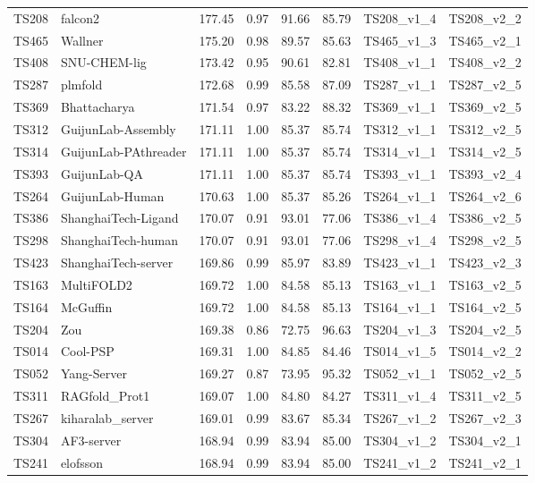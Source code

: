 \begin{longtable}{llllllll}
TS208 & falcon2 & 177.45 & 0.97 & 91.66 & 85.79 & TS208\_v1\_4 & TS208\_v2\_2 \\ 
TS465 & Wallner & 175.20 & 0.98 & 89.57 & 85.63 & TS465\_v1\_3 & TS465\_v2\_1 \\ 
TS408 & SNU-CHEM-lig & 173.42 & 0.95 & 90.61 & 82.81 & TS408\_v1\_1 & TS408\_v2\_2 \\ 
TS287 & plmfold & 172.68 & 0.99 & 85.58 & 87.09 & TS287\_v1\_1 & TS287\_v2\_5 \\ 
TS369 & Bhattacharya & 171.54 & 0.97 & 83.22 & 88.32 & TS369\_v1\_1 & TS369\_v2\_5 \\ 
TS312 & GuijunLab-Assembly & 171.11 & 1.00 & 85.37 & 85.74 & TS312\_v1\_1 & TS312\_v2\_5 \\ 
TS314 & GuijunLab-PAthreader & 171.11 & 1.00 & 85.37 & 85.74 & TS314\_v1\_1 & TS314\_v2\_5 \\ 
TS393 & GuijunLab-QA & 171.11 & 1.00 & 85.37 & 85.74 & TS393\_v1\_1 & TS393\_v2\_4 \\ 
TS264 & GuijunLab-Human & 170.63 & 1.00 & 85.37 & 85.26 & TS264\_v1\_1 & TS264\_v2\_6 \\ 
TS386 & ShanghaiTech-Ligand & 170.07 & 0.91 & 93.01 & 77.06 & TS386\_v1\_4 & TS386\_v2\_5 \\ 
TS298 & ShanghaiTech-human & 170.07 & 0.91 & 93.01 & 77.06 & TS298\_v1\_4 & TS298\_v2\_5 \\ 
TS423 & ShanghaiTech-server & 169.86 & 0.99 & 85.97 & 83.89 & TS423\_v1\_1 & TS423\_v2\_3 \\ 
TS163 & MultiFOLD2 & 169.72 & 1.00 & 84.58 & 85.13 & TS163\_v1\_1 & TS163\_v2\_5 \\ 
TS164 & McGuffin & 169.72 & 1.00 & 84.58 & 85.13 & TS164\_v1\_1 & TS164\_v2\_5 \\ 
TS204 & Zou & 169.38 & 0.86 & 72.75 & 96.63 & TS204\_v1\_3 & TS204\_v2\_5 \\ 
TS014 & Cool-PSP & 169.31 & 1.00 & 84.85 & 84.46 & TS014\_v1\_5 & TS014\_v2\_2 \\ 
TS052 & Yang-Server & 169.27 & 0.87 & 73.95 & 95.32 & TS052\_v1\_1 & TS052\_v2\_5 \\ 
TS311 & RAGfold\_Prot1 & 169.07 & 1.00 & 84.80 & 84.27 & TS311\_v1\_4 & TS311\_v2\_5 \\ 
TS267 & kiharalab\_server & 169.01 & 0.99 & 83.67 & 85.34 & TS267\_v1\_2 & TS267\_v2\_3 \\ 
TS304 & AF3-server & 168.94 & 0.99 & 83.94 & 85.00 & TS304\_v1\_2 & TS304\_v2\_1 \\ 
TS241 & elofsson & 168.94 & 0.99 & 83.94 & 85.00 & TS241\_v1\_2 & TS241\_v2\_1 \\ 

\end{longtable}
